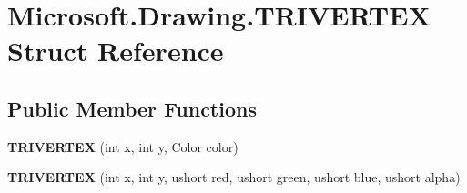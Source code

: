 \hypertarget{struct_microsoft_1_1_drawing_1_1_t_r_i_v_e_r_t_e_x}{
\section{Microsoft.Drawing.TRIVERTEX Struct Reference}
\label{struct_microsoft_1_1_drawing_1_1_t_r_i_v_e_r_t_e_x}
}
\subsection*{Public Member Functions}
\begin{DoxyCompactItemize}
\item 
\hypertarget{struct_microsoft_1_1_drawing_1_1_t_r_i_v_e_r_t_e_x_adb39edebf08e45b7c1bd32ea77b74277}{
{\bfseries TRIVERTEX} (int x, int y, Color color)}
\label{struct_microsoft_1_1_drawing_1_1_t_r_i_v_e_r_t_e_x_adb39edebf08e45b7c1bd32ea77b74277}

\item 
\hypertarget{struct_microsoft_1_1_drawing_1_1_t_r_i_v_e_r_t_e_x_a923a85e7a7c21ce3193233ed9378863c}{
{\bfseries TRIVERTEX} (int x, int y, ushort red, ushort green, ushort blue, ushort alpha)}
\label{struct_microsoft_1_1_drawing_1_1_t_r_i_v_e_r_t_e_x_a923a85e7a7c21ce3193233ed9378863c}

\end{DoxyCompactItemize}
